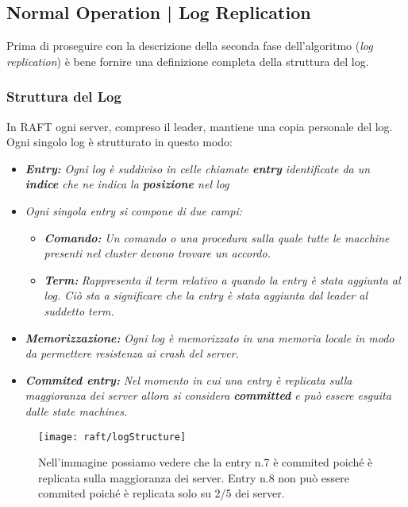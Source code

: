 \subsection{Normal Operation | Log Replication}
\label{Log Replication}
Prima di proseguire con la descrizione della seconda fase dell'algoritmo (\textit{log replication}) è bene fornire una definizione completa della struttura del log.
  \subsubsection{Struttura del Log}
  In RAFT ogni server, compreso il leader, mantiene una copia personale del log.\\ Ogni singolo log è strutturato in questo modo:
  \begin{itemize}
    \item{\emph{\textbf{Entry:}}}
    \emph{Ogni log è suddiviso in celle chiamate \textbf{entry} identificate da un \textbf{indice} che ne indica la \textbf{posizione} nel log}
    \item{\emph{Ogni singola entry si compone di due campi:}}
      \begin{itemize}
        \item{\emph{\textbf{Comando:}}}
        \emph{Un comando o una procedura sulla quale tutte le macchine presenti nel cluster devono trovare un accordo.}
        \item{\emph{\textbf{Term:}}}
        \emph{Rappresenta il term relativo a quando la entry è stata aggiunta al log. Ciò sta a significare che la entry è stata aggiunta dal leader al suddetto term.}
      \end{itemize}
    \item{\emph{\textbf{Memorizzazione:}}}
    \emph{Ogni log è memorizzato in una memoria locale in modo da permettere resistenza ai crash del server.}
    \item{\emph{\textbf{Commited entry:}}}
    \emph{Nel momento in cui una entry è replicata sulla maggioranza dei server allora si considera \textbf{committed} e può essere esguita dalle state machines.}
  \end{itemize}
  \begin{figure}[H]
  	\centering
  	\texttt{[image: raft/logStructure]}
  	\caption{Nell'immagine possiamo vedere che la entry n.7 è commited poiché è replicata sulla maggioranza dei server. Entry n.8 non può essere commited poiché è replicata solo su 2/5 dei server.}
  	\label{fig:figure6}
  \end{figure}

